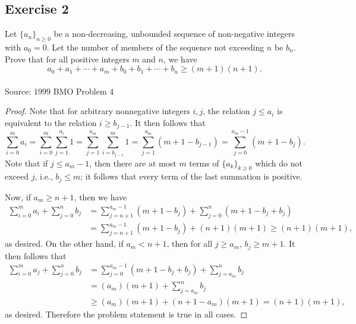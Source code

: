 \documentclass[12pt]{article}
\begin{document}
\vspace{3.1in}






\subsection*{Exercise 2}
Let $\{a_n \}_{n\ge 0}$ be a non-decreasing, unbounded sequence of non-negative integers with $a_0=0$.  Let the number of members of the sequence not exceeding $n$ be $b_n$.  Prove that for all positive integers $m$ and $n$, we have
$$ a_0 + a_1 + \dotsb + a_m + b_0 + b_1 + \dotsb + b_n \ge (m+1)(n+1) . $$\\

Source: 1999 BMO Problem 4\\

$$$$


\begin{proof}
Note that for arbitrary nonnegative integers $i,j$, the relation $j \le a_i$ is equivalent to the relation $i \ge b_{j-1}$.  It then follows that
$$ \sum_{i=0}^m a_i = \sum_{i=0}^m \sum_{j=1}^{a_i} 1 = \sum_{j=1}^{a_m} \sum_{i=b_{j-1}}^m 1 = \sum_{j=1}^{a_m} ( m+1 - b_{j-1} ) = \sum_{j=0}^{a_m-1} (m+1 - b_j ) . $$
Note that if $j \le a_m-1$, then there are at most $m$ terms of $\{ a_k\}_{k\ge 0}$ which do not exceed $j$, i.e., $b_j \le m$; it follows that every term of the last summation is positive.

Now, if $a_m \ge n+1$, then we have
$$ \begin{align*}
\sum_{i=0}^m a_i + \sum_{j=0}^n b_j &= \sum_{j=n+1}^{a_m-1}(m+1 - b_j) + \sum_{j=0}^n (m+1 - b_j + b_j) \\
&= \sum_{j=n+1}^{a_m-1}(m+1-b_j) + (n+1)(m+1) \ge (n+1)(m+1),
\end{align*} $$
as desired.  On the other hand, if $a_m < n+1$, then for all $j\ge a_m$, $b_j \ge m+1$.  It then follows that
$$ \begin{align*}
 \sum_{i=0}^m a_j + \sum_{j=0}^n b_j &= \sum_{j=0}^{a_m-1}(m+1 - b_j + b_j) + \sum_{j=a_m}^n b_j \\
&= (a_m)(m+1) + \sum_{j=a_m}^n b_j \\
&\ge (a_m)(m+1) + (n+1-a_m)(m+1) = (n+1)(m+1),
\end{align*} $$
as desired.  Therefore the problem statement is true in all cases.

\end{proof}
\end{document}
